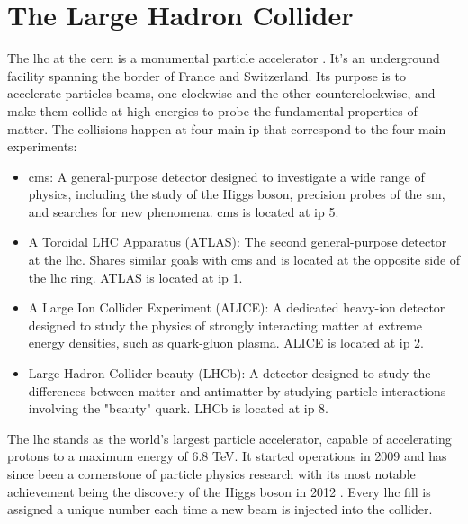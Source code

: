 \section{The Large Hadron Collider}
\label{subsec:lhc}


The \acrfull{lhc} at the \acrfull{cern} is a monumental particle accelerator \cite{lhc}. It's an underground facility spanning the border of France and Switzerland. Its purpose is to accelerate particles beams, one clockwise and the other counterclockwise, and make them collide at high energies to probe the fundamental properties of matter. The collisions happen at four main \acrfull{ip} that correspond to the four main experiments:
\begin{itemize}
	\item \acrfull{cms}: A general-purpose detector designed to investigate a wide range of physics, including the study of the Higgs boson, precision probes of the \acrshort{sm}, and searches for new phenomena. \acrshort{cms} is located at \acrshort{ip} 5.
	\item A Toroidal LHC Apparatus (ATLAS): The second general-purpose detector at the \acrshort{lhc}. Shares similar goals with \acrshort{cms} and is located at the opposite side of the \acrshort{lhc} ring. ATLAS is located at \acrshort{ip} 1.
	\item A Large Ion Collider Experiment (ALICE): A dedicated heavy-ion detector designed to study the physics of strongly interacting matter at extreme energy densities, such as quark-gluon plasma. ALICE is located at \acrshort{ip} 2.
	\item Large Hadron Collider beauty (LHCb): A detector designed to study the differences between matter and antimatter by studying particle interactions involving the "beauty" quark. LHCb is located at \acrshort{ip} 8.
\end{itemize}

The \acrshort{lhc} stands as the world's largest particle accelerator, capable of accelerating protons to a maximum energy of 6.8 TeV. It started operations in 2009 and has since been a cornerstone of particle physics research with its most notable achievement being the discovery of the Higgs boson in 2012 \cite{HiggsDiscovery}. Every \acrshort{lhc} fill is assigned a unique number each time a new beam is injected into the collider.

